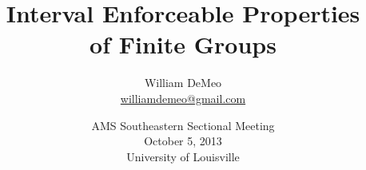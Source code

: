\RequirePackage{snapshot}
\newcommand{\ConfColor}{darkred}

\newtheorem{prop}[theorem]{Proposition}
\newtheorem{assumption}[theorem]{Assumption}
\theoremstyle{definition}
\newtheorem{question}[theorem]{Question}
\newtheorem{claim}[claim]{Claim}
\newtheorem{conjecture}[conjecture]{Conjecture}
\newtheorem{case}{Case}
\theoremstyle{remark}
\newtheorem*{computations}{Computations}
\newtheorem*{remark}{Remark}
\newtheorem*{remarks}{Remarks}
\newtheorem*{notation}{Notation}
\newtheorem*{exs}{Examples}
\newtheorem*{ex}{Example}

 \newcommand{\IE}{{\small IE}}
 \newcommand{\defn}[1]{\textcolor{\ConfColor}{\textit{\textbf{#1}}}}
\title[IE Properties]{Interval Enforceable Properties\\of Finite Groups}

\author[William DeMeo]{William DeMeo\\
{\small \url{williamdemeo@gmail.com}}}

\date[]{\vskip1cm
AMS Southeastern Sectional Meeting\\[6pt]
October 5, 2013\\[6pt]
{\color{darkred}University of Louisville}
}



